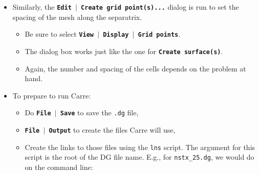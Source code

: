 \documentclass[12pt]{report}
\begin{document}
\begin{enumerate}
\begin{itemize}
\begin{itemize}
with 19 in the SOL.  The number in the PFR must match
that of the Core. 
      \item Make a note of the number of cells used in the 
Core; this will be useful in setting up the input file for 
DEGAS 2's {\tt defineback} input file.
      \item The values of ``Delta1'' and ``Delta2'' can then be varied, 
either by hand or by tweaking the graphical display in the dialog box.
      \item The particular objective depends on the problem at hand.  E.g.,
it might be to get the spacing of surfaces
near midplane roughly uniform going across the separatrix about
1 mm apart.
    \end{itemize}
    \item Similarly, the \textbf{\texttt{Edit \begin{math}\vert{}\end{math} Create grid point(s)...}} dialog is run to 
set the spacing of the mesh along the separatrix.
    \begin{itemize}
      \item Be sure to select \textbf{\texttt{View \begin{math}\vert{}\end{math} Display \begin{math}\vert{}\end{math} Grid points}}.
      \item The dialog box works just like the one for 
\textbf{\texttt{Create surface(s)}}.
      \item Again, the number and spacing of the cells depends on the
problem at hand.
    \end{itemize}
    \item To prepare to run Carre:
    \begin{itemize}
      \item Do \textbf{\texttt{File \begin{math}\vert{}\end{math} Save}} 
to save the \verb+.dg+ file,
      \item \textbf{\texttt{File \begin{math}\vert{}\end{math} Output}} 
to create the files Carre will use,
      \item Create the links to those files using the {\tt lns} script.  The
argument for this script is the root of the DG file name.  E.g.,
for \verb+nstx_25.dg+, we would do on the command line: \\

\end{itemize}
\end{itemize}
\end{enumerate}
\end{document}
